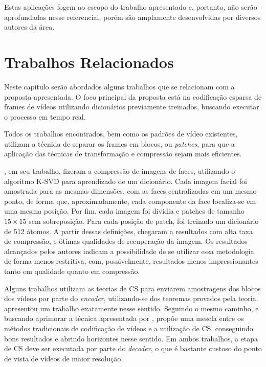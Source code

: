 \documentclass[cic,tc]{iiufrgs}
\begin{document}
Estas aplicações fogem ao escopo do trabalho apresentado e, portanto, não serão
aprofundadas nesse referencial, porém são amplamente desenvolvidas por diversos
autores da área.



\chapter{Trabalhos Relacionados}
\label{cap:relacionados}
Neste capítulo serão abordados alguns trabalhos que se relacionam com a proposta apresentada.
O foco principal da proposta está na codificação esparsa de frames de vídeos utilizando dicionários
previamente treinados, buscando executar o processo em tempo real.

Todos os trabalhos encontrados, bem como os padrões de vídeo existentes,
utilizam a técnida de separar os frames em blocos, ou \textit{patches},
para que a aplicação das técnicas de transformação e compressão sejam 
mais eficientes.

\citet{BRYTFACEKSVD}, em seu trabalho, fizeram a compressão de imagens de faces, 
utilizando o algoritmo K-SVD para aprendizado de um dicionário. 
Cada imagem facial foi amostrada para as mesmas dimensões, com as faces centralizadas
em um mesmo ponto, de forma que, aproximadamente, cada componente da face localiza-se
em uma mesma posição.
Por fim, cada imagem foi dividia e patches de tamanho $15\times 15$ sem sobreposição.
Para cada posição de patch, foi treinado um dicionário
de 512 átomos. A partir dessas definições, \citet{BRYTFACEKSVD} chegaram a resultados 
com alta taxa de compressão, e ótimas qualidades de recuperação da imagem.
Os resultados alcançados pelos autores indicam a possibilidade de se utilizar essa
metodologia de forma menos restritiva, com, possivelmente, resultados menos impressionantes
tanto em qualidade quanto em compressão.

Alguns trabalhos utilizam as teorias de CS para enviarem amostragens dos blocos
dos vídeos por parte do \textit{encoder}, utilizando-se dos teoremas provados pela teoria.
\citet{NebotDVC} apresentou um trabalho exatamente nesse sentido.
Seguindo o mesmo caminho, e buscando aprimorar a técnica apresentada por \citeauthor{NebotDVC}, 
\citet{DoDISCOS} propõe uma mescla entre os métodos tradicionais de codificação de vídeos
e a utilização de CS, conseguindo bons resultados e abrindo horizontes nesse sentido.
Em ambos trabalhos, a etapa de CS deve ser executada por parte do \textit{decoder}, 
o que é bastante custoso do ponto de vista de vídeos de maior resolução.
\end{document}
